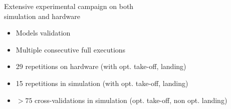\documentclass[aspectratio=169]{beamer}
\begin{document}
\begin{frame}
	\centering Extensive experimental campaign on both\\ simulation and hardware
	\begin{multicols}{2}
		\begin{itemize}
			\item Models validation
			\item Multiple consecutive full executions
			\item 29 repetitions on hardware (with opt. take-off, landing)
			\item 15 repetitions in simulation (with opt. take-off, landing)
			\item $> 75$ cross-validations in simulation (opt. take-off, non opt. landing) 
			 
		\end{itemize}
		\vfill\null
		\columnbreak
		\vspace{0.5cm}\hphantom{e}\\
		\begin{figure}
			\centering
		\end{figure}
	\end{multicols}
\end{frame}

\titleframe
\end{document}
